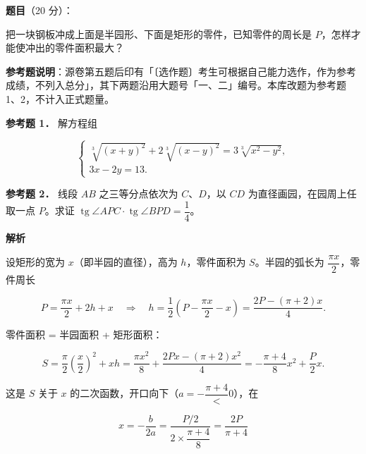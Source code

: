 \begin{answer}

\textbf{题目}（20 分）：

把一块钢板冲成上面是半园形、下面是矩形的零件，已知零件的周长是 $P$，怎样才能使冲出的零件面积最大？
\nopagebreak[4]
\begin{center}\end{center}
\nopagebreak[4]
\begin{gktip}
\textbf{参考题说明}：源卷第五题后印有「〔选作题〕考生可根据自己能力选作，作为参考成绩，不列入总分」，其下两题沿用大题号「一、二」编号。本库改题为参考题 1、2，不计入正式题量。
\end{gktip}

\textbf{参考题 1．} 解方程组

\nopagebreak[4]
\[
\begin{cases}
\sqrt[3]{(x+y)^2}+2\sqrt[3]{(x-y)^2}=3\sqrt[3]{x^2-y^2},\\
3x-2y=13.
\end{cases}
\]

\textbf{参考题 2．} 线段 $AB$ 之三等分点依次为 $C\text{、}D$，以 $CD$ 为直径画园，在园周上任取一点 $P$。求证 $\operatorname{tg}\angle APC\cdot\operatorname{tg}\angle BPD=\dfrac14$。
\nopagebreak[4]
\begin{center}\end{center}
\nopagebreak[4]
\textbf{解析}
\nopagebreak[4]
\begin{center}\end{center}
\nopagebreak[4]
设矩形的宽为 $x$（即半园的直径），高为 $h$，零件面积为 $S$。半园的弧长为 $\dfrac{\pi x}{2}$，零件周长

\nopagebreak[4]
\[
P=\frac{\pi x}{2}+2h+x
\quad\Longrightarrow\quad
h=\frac12\left(P-\frac{\pi x}{2}-x\right)
=\frac{2P-(\pi+2)x}{4}.
\]

零件面积 = 半园面积 + 矩形面积：

\nopagebreak[4]
\[
S=\frac{\pi}{2}\left(\frac{x}{2}\right)^2+xh
=\frac{\pi x^2}{8}+\frac{2Px-(\pi+2)x^2}{4}
=-\frac{\pi+4}{8}x^2+\frac{P}{2}x.
\]

这是 $S$ 关于 $x$ 的二次函数，开口向下（$a=-\dfrac{\pi+4}<0$），在

\nopagebreak[4]
\[
x=-\frac{b}{2a}=\frac{P/2}{2\times\dfrac{\pi+4}{8}}=\frac{2P}{\pi+4}
\]


\end{answer}
